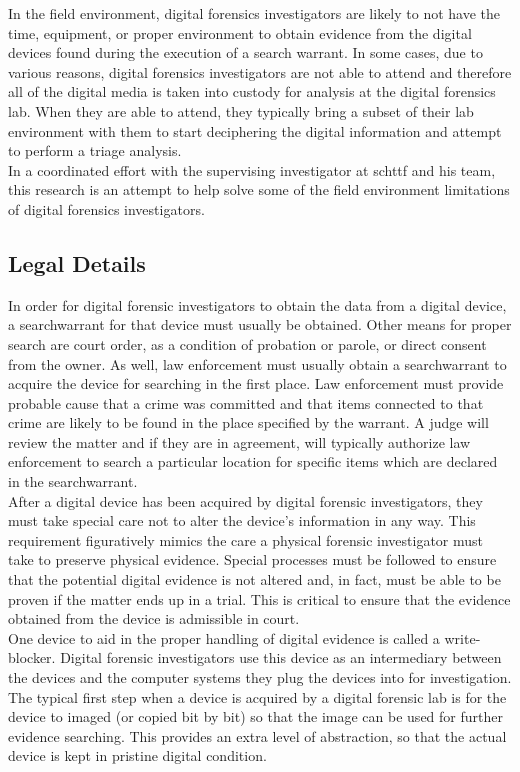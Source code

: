 \documentclass[12pt]{article}
\begin{document}
In the field environment, digital forensics
investigators are likely to not have the time, equipment, or proper environment to
obtain evidence from the digital devices found during the execution of a search
warrant.  In some cases, due to various reasons, digital forensics investigators
are not able to attend and therefore all of the digital media is taken into
custody for analysis at the digital forensics lab.  When they are able to attend,
they typically
bring a subset of their lab environment with them to start deciphering
the digital information and attempt to perform a triage analysis.\\

In a coordinated effort with the supervising investigator at \gls{schttf} and his team,
this research is an attempt to help solve some of the field environment limitations
of digital forensics investigators.

\subsection{Legal Details}
In order for digital forensic investigators to obtain the data from a digital device,
a \gls{searchwarrant} for that device must usually be obtained.  Other means for proper
search are court order, as a condition of probation or parole, or direct consent from
the owner.    As well, law enforcement must usually 
obtain a \gls{searchwarrant} to acquire the device for searching in the first place.
Law enforcement must provide probable cause that a crime 
was committed and that items connected to that crime are likely to be found 
in the place specified by the warrant.  A judge will review the matter and if
they are in agreement, will typically authorize law enforcement to search a particular
location for specific items which are declared in the \gls{searchwarrant}.\\

After a digital device has been acquired by digital forensic investigators, they
must take special care not to alter the device's information in any way.  This 
requirement figuratively mimics the care a physical forensic investigator must
take to preserve physical evidence.  Special processes must be followed to ensure
that the potential digital evidence is not altered and, in fact, must be able to 
be proven if the matter ends up in a trial.  This is critical to ensure that the
evidence obtained from the device is admissible in court.\\

One device to aid in the proper handling of digital evidence is called a
write-blocker.  Digital forensic investigators use this device as an intermediary
between the devices and the computer systems they plug the devices into for
investigation.  The typical first step when a device is acquired by a digital
forensic lab is for the device to imaged (or copied bit by bit) so that the
image can be used for further evidence searching.  This provides an extra level of
abstraction, so that the actual device is kept in pristine digital condition.\\
\end{document}

